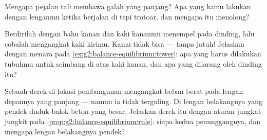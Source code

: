 \begin{exercise}[$\star$]\label{exo:g2:balance-equilibrium:8}
Mengapa pejalan tali membawa galah yang panjang? Apa yang kamu lakukan
dengan lenganmu ketika berjalan di tepi trotoar, dan mengapa itu
menolong?
\end{exercise}

\begin{exercise}[$\star$]\label{exo:g2:balance-equilibrium:9}
Berdirilah dengan bahu kanan dan kaki kananmu menempel pada dinding,
lalu cobalah mengangkat kaki kirimu. Kamu tidak bisa --- tanpa jatuh!
Jelaskan dengan menara pada \cref{ex:g2:balance-equilibrium:tower}:
apa yang harus dilakukan tubuhmu untuk seimbang di atas kaki kanan,
dan apa yang dilarang oleh dinding itu?
\end{exercise}

\begin{exercise}[$\star\star$]\label{exo:g2:balance-equilibrium:10}
Sebuah derek di lokasi pembangunan mengangkat beban berat pada lengan
depannya yang panjang --- namun ia tidak terguling. Di lengan
belakangnya yang pendek duduk balok beton yang besar. Jelaskan derek
itu dengan aturan jungkat-jungkit pada
\cref{prop:g2:balance-equilibrium:rule}: siapa kedua penunggangnya,
dan mengapa lengan belakangnya pendek?
\end{exercise}
